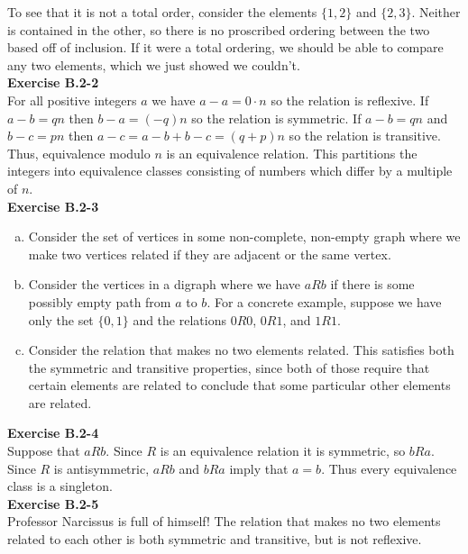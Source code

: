 \documentclass{article}
\begin{document}
To see that it is not a total order, consider the elements $\{1,2\}$ and $\{2,3\}$. Neither is contained in the other, so there is no proscribed ordering between the two based off of inclusion. If it were a total ordering, we should be able to compare any two elements, which we just showed we couldn't.\\


\noindent\textbf{Exercise B.2-2}\\

For all positive integers $a$ we have $a - a = 0\cdot n$ so the relation is reflexive.  If $a-b = qn$ then $b-a = (-q)n$ so the relation is symmetric.  If $a - b = qn$ and $b-c = pn$ then $a - c = a - b + b - c = (q+p)n$ so the relation is transitive. Thus, equivalence modulo $n$ is an equivalence relation.  This partitions the integers into equivalence classes consisting of numbers which differ by a multiple of $n$.  \\

\noindent\textbf{Exercise B.2-3}\\
\begin{enumerate}[a.]
\item
Consider the set of vertices in some non-complete, non-empty graph where we make two vertices related if they are adjacent or the same vertex.
\item
Consider the vertices in a digraph where we have $aRb$ if there is some possibly empty path from $a$ to $b$. For a concrete example, suppose we have only the set $\{0,1\}$ and the relations $0R0$, $0R1$, and $1R1$.
\item
Consider the relation that makes no two elements related. This satisfies both the symmetric and transitive properties, since both of those require that certain elements are related to conclude that some particular other elements are related.\\

\end{enumerate}

\noindent\textbf{Exercise B.2-4}\\

Suppose that $a R b$.  Since $R$ is an equivalence relation it is symmetric, so $bRa$.  Since $R$ is antisymmetric, $aRb$ and $bRa$ imply that $a = b$.  Thus every equivalence class is a singleton. \\

\noindent\textbf{Exercise B.2-5}\\
Professor Narcissus is full of himself! The relation that makes no two elements related to each other is both symmetric and transitive, but is not reflexive.\\
\end{document}

